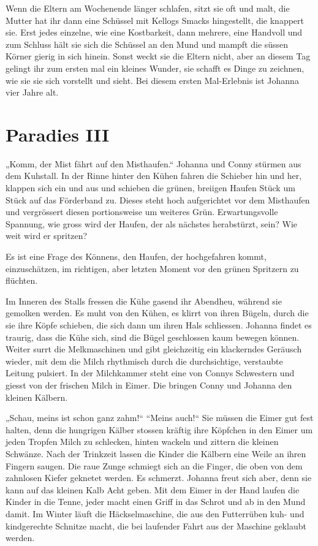 \documentclass[10pt,a5paper]{book}
\begin{document}
Wenn die Eltern am Wochenende länger schlafen, sitzt sie oft und malt, die Mutter hat ihr dann eine Schüssel mit Kellogs Smacks hingestellt, die knappert sie. Erst jedes einzelne, wie eine Kostbarkeit, dann mehrere, eine Handvoll und zum Schluss hält sie sich die Schüssel an den Mund und mampft die süssen Körner gierig in sich hinein. Sonst weckt sie die Eltern nicht, aber an diesem Tag gelingt ihr zum ersten mal ein kleines Wunder, sie schafft es Dinge zu zeichnen, wie sie sie sich vorstellt und sieht. Bei diesem ersten Mal-Erlebnis ist Johanna vier Jahre alt.



\section*{Paradies III}



„Komm, der Mist fährt auf den Misthaufen.“ Johanna und Conny stürmen aus dem Kuhstall. In der Rinne hinter den Kühen fahren die Schieber hin und her, klappen sich ein und aus und schieben die grünen, breiigen Haufen Stück um Stück auf das Förderband zu. Dieses steht hoch aufgerichtet vor dem Misthaufen und vergrössert diesen portionsweise um weiteres Grün.
Erwartungsvolle Spannung, wie gross wird der Haufen, der als nächstes herabstürzt, sein? Wie weit wird er spritzen?

Es ist eine Frage des Könnens, den Haufen, der hochgefahren kommt, einzuschätzen, im richtigen, aber letzten Moment vor den grünen Spritzern zu flüchten.

Im Inneren des Stalls fressen die Kühe gasend ihr Abendheu, während sie gemolken werden. Es muht von den Kühen, es klirrt von ihren Bügeln, durch die sie ihre Köpfe schieben, die sich dann um ihren Hals schliessen. Johanna findet es traurig, dass die Kühe sich, sind die Bügel geschlossen kaum bewegen können. Weiter surrt die Melkmaschinen und gibt gleichzeitig ein klackerndes Geräusch wieder, mit dem die Milch rhythmisch durch die durchsichtige, verstaubte Leitung pulsiert. In der Milchkammer steht eine von Connys Schwestern und giesst von der frischen Milch in Eimer. Die bringen Conny und Johanna den kleinen Kälbern. 

„Schau, meins ist schon ganz zahm!“ “Meins auch!“ Sie müssen die Eimer gut fest halten, denn die hungrigen Kälber stossen kräftig ihre Köpfchen in den Eimer um jeden Tropfen Milch zu schlecken, hinten wackeln und zittern die kleinen Schwänze. Nach der Trinkzeit lassen die Kinder die Kälbern eine Weile an ihren Fingern saugen. Die raue Zunge schmiegt sich an die Finger, die oben von dem zahnlosen Kiefer geknetet werden. Es schmerzt. Johanna freut sich aber, denn sie kann auf  das kleinen Kalb Acht geben. Mit dem Eimer in der Hand laufen die Kinder in die Tenne, jeder macht einen Griff in das Schrot und ab in den Mund damit. Im Winter läuft die Häckselmaschine, die aus den Futterrüben kuh- und kindgerechte Schnitze macht, die bei laufender Fahrt aus der Maschine geklaubt werden.
\end{document}
